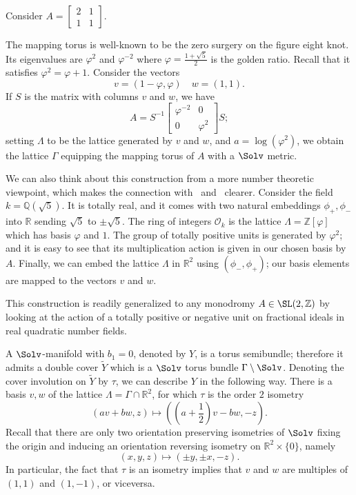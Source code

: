 \begin{exam}\label{figure8}
Consider $ A=
\begin{bmatrix}2&1\\1 &1
\end{bmatrix}.$

The mapping torus is well-known to be the zero surgery on the figure eight knot. Its eigenvalues are $\varphi^2$ and $\varphi^{-2}$ where $\varphi=\frac{1+\sqrt{5}}{2}$ is the golden ratio. Recall that it satisfies $\varphi^2=\varphi+1$. Consider the vectors
\[
v=(1-\varphi,\varphi)\quad w=(1,1).
\]
If $S$ is the matrix with columns $v$ and $w$, we have
\[
A=S^{-1}
\begin{bmatrix}\varphi^{-2}&0\\0 &\varphi^{2}
\end{bmatrix}S;
\]
setting $\Lambda$ to be the lattice generated by $v$ and $w$, and $a=\log(\varphi^2)$, we obtain the lattice $\Gamma$ equipping the mapping torus of $A$ with a $\Solv$ metric.
\end{exam}

\begin{rema}\label{NT}
We can also think about this construction from a more number theoretic viewpoint, which makes the connection with~\cite{Hir} and~\cite{ADS} clearer. Consider the field $k=\mathbb{Q}(\sqrt{5})$. It is totally real, and it comes with two natural embeddings $\phi_+,\phi_-$ into $\mathbb{R}$ sending $\sqrt{5}$ to $\pm\sqrt{5}$. The ring of integers $\mathcal{O}_k$ is the lattice $\Lambda=\mathbb{Z}[\varphi]$ which has basis $\varphi$ and $1$. The group of totally positive units is generated by $\varphi^2$; and it is easy to see that its multiplication action is given in our chosen basis by $A$. Finally, we can embed the lattice $\Lambda$ in $\mathbb{R}^2$ using $(\phi_-,\phi_+)$; our basis elements are mapped to the vectors $v$ and $w$.


This construction is readily generalized to any monodromy $A\in \SL(2,\mathbb{Z})$ by looking at the action of a totally positive or negative unit on fractional ideals in real quadratic number fields.
\end{rema}

A $\Solv$-manifold with $b_1=0$, denoted by $Y$, is a torus semibundle; therefore it admits a double cover $\tilde{Y}$ which is a $\Solv$ torus bundle $\Gamma\setminus\Solv$. Denoting the cover involution on $\tilde{Y}$ by $\tau$, we can describe $Y$ in the following way. There is a basis $v,w$ of the lattice $\Lambda=\Gamma\cap \mathbb{R}^2$, for which $\tau$ is the order $2$ isometry
\[
(av+bw,z)\mapsto \left(\left(a+\frac{1}{2}\right)v-bw,-z\right).
\]
Recall that there are only two orientation preserving isometries of $\Solv$ fixing the origin and inducing an orientation reversing isometry on $\mathbb{R}^2\times \{0\}$, namely
\[
(x,y,z)\mapsto (\pm y, \pm x, -z).
\]
In particular, the fact that $\tau$ is an isometry implies that $v$ and $w$ are multiples of $(1,1)$ and $(1,-1)$, or viceversa.

